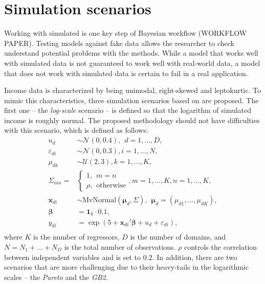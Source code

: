 \section{Simulation scenarios}

Working with simulated is one key step of Bayesian workflow (WORKFLOW PAPER).
Testing models against fake data allows the researcher to check understand potential problems with the methods.
While a model that works well with simulated data is not guaranteed to work well with real-world data,
a model that does not work with simulated data is certain to fail in a real application.

Income data is characterized by being unimodal, right-skewed and leptokurtic.
To mimic this characteristics, three simulation scenarios based on \cite{rojas_perilla_data_2020} are proposed.
The first one – the \textit{log-scale} scenario – is defined so that the logarithm of simulated income is roughly normal.
The proposed methodology should not have difficulties with this scenario, which is defined as follows:
\begin{equation}
    \begin{split}
        u_d & \sim \mathcal N(0, 0.4), ~~ d = 1,...,D,\\
        \varepsilon_{di} & \sim \mathcal{N}(0, 0.3), i = 1,...,N,\\
        \mu_{dk} & \sim \mathcal{U}(2, 3), k = 1,...,K,\\
        \Sigma_{mn} = &\begin{cases} 1, ~~ m = n \\ \rho,  ~~ \text{otherwise}  \end{cases},
            m = 1,...,K, n = 1,...,K,\\
        \boldsymbol x_{di}  &\sim \text{MvNormal} (\boldsymbol \mu_{d}, \Sigma) ,
            ~~ \boldsymbol \mu_{d} = (\mu_{d1}, ..., \mu_{dK}),\\
        \boldsymbol\beta & =  \mathbf{1}_k \cdot 0.1,\\
        y_{di} & = \exp(5 + \boldsymbol x_{di}' \boldsymbol \beta    + u_d + \varepsilon_{di}),\\
    \end{split}
    \label{eq:log_scenario}
\end{equation}
where $K$ is the number of regressors, $D$ is the number of domains, and $N = N_1 + ... + N_D$ is the total number of observations.
$\rho$ controls the correlation between independent variables and is set to 0.2.
In addition, there are two scenarios that are more challenging due to their heavy-tails in the logarithmic scales – the \textit{Pareto} and the \textit{GB2}.

